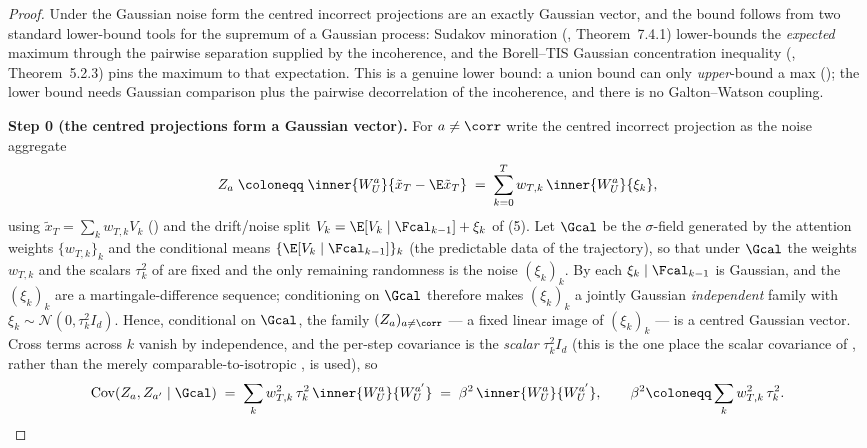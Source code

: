 \begin{proof}
Under the Gaussian noise form  the centred
incorrect projections are an exactly Gaussian vector, and the bound follows
from two standard lower-bound tools for the supremum of a Gaussian process:
Sudakov minoration (\cite{vershynin2018}, Theorem~7.4.1) lower-bounds the
\emph{expected} maximum through the pairwise separation supplied by the
incoherence, and the Borell--TIS Gaussian concentration inequality
(\cite{vershynin2018}, Theorem~5.2.3) pins the maximum to that expectation.
This is a genuine lower bound: a union bound can only \emph{upper}-bound a
max (); the lower bound needs Gaussian comparison
plus the pairwise decorrelation of the incoherence, and there is no
Galton--Watson coupling.

\smallskip\noindent\textbf{Step 0 (the centred projections form a Gaussian
vector).} For $a\neq\corr$ write the centred incorrect projection as the
noise aggregate
\begin{align*}
   Z_a \;\coloneqq\; \inner{W_U^a}{\tilde x_T-\E\tilde x_T}
       \;=\; \sum_{k=0}^{T} w_{T,k}\,\inner{W_U^a}{\xi_k},
\end{align*}
using $\tilde x_T=\sum_k w_{T,k}V_k$ () and
the drift/noise split $V_k=\E[V_k\mid\Fcal_{k-1}]+\xi_k$ of
(5). Let $\Gcal$ be the $\sigma$-field
generated by the attention weights $\{w_{T,k}\}_{k}$ and the conditional
means $\{\E[V_k\mid\Fcal_{k-1}]\}_k$ (the predictable data of the
trajectory), so that under $\Gcal$ the weights $w_{T,k}$ and the scalars
$\tau_k^2$ of  are fixed and the only remaining
randomness is the noise $(\xi_k)_k$. By  each
$\xi_k\mid\Fcal_{k-1}$ is Gaussian, and the $(\xi_k)_k$ are a
martingale-difference sequence; conditioning on $\Gcal$ therefore makes
$(\xi_k)_k$ a jointly Gaussian \emph{independent} family with
$\xi_k\sim\mathcal N(0,\tau_k^2 I_d)$. Hence, conditional on $\Gcal$, the
family $(Z_a)_{a\neq\corr}$ --- a fixed linear image of $(\xi_k)_k$ --- is
a centred Gaussian vector. Cross terms across $k$ vanish by independence,
and the per-step covariance is the \emph{scalar} $\tau_k^2 I_d$ (this is the
one place the scalar covariance of , rather than
the merely comparable-to-isotropic , is used), so
\begin{align}\label{eq:antic_gram_cov}
   \operatorname{Cov}(Z_a,Z_{a'}\mid\Gcal)
   \;=\; \sum_{k} w_{T,k}^2\,\tau_k^2\,\inner{W_U^a}{W_U^{a'}}
   \;=\; \beta^2\,\inner{W_U^a}{W_U^{a'}},
   \qquad
   \beta^2\coloneqq\sum_k w_{T,k}^2\,\tau_k^2 .
\end{align}


\end{proof}
